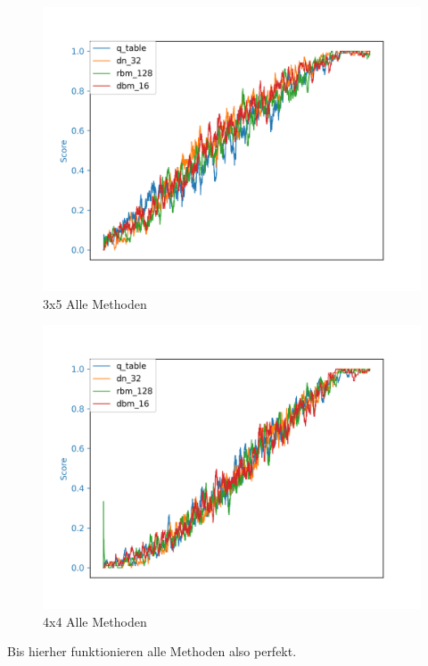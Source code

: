 \begin{figure}[H]
\centering
\includegraphics[width=\textwidth]{Figures/all_3x5_q_table_dn_32_rbm_128_dbm_16.png}
\caption{3x5 Alle Methoden}
\label{all_3}
\end{figure}

\begin{figure}[H]
\centering
\includegraphics[width=\textwidth]{Figures/all_4x4_q_table_dn_32_rbm_128_dbm_16.png}
\caption{4x4 Alle Methoden}
\label{all_4}
\end{figure}

Bis hierher funktionieren alle Methoden also perfekt.

